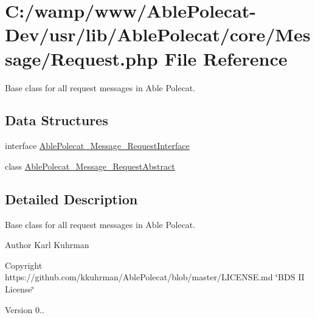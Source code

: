 \hypertarget{_request_8php}{}\section{C\+:/wamp/www/\+Able\+Polecat-\/\+Dev/usr/lib/\+Able\+Polecat/core/\+Message/\+Request.php File Reference}
\label{_request_8php}


Base class for all request messages in Able Polecat.  


\subsection*{Data Structures}
\begin{DoxyCompactItemize}
\item 
interface \hyperlink{interface_able_polecat___message___request_interface}{Able\+Polecat\+\_\+\+Message\+\_\+\+Request\+Interface}
\item 
class \hyperlink{class_able_polecat___message___request_abstract}{Able\+Polecat\+\_\+\+Message\+\_\+\+Request\+Abstract}
\end{DoxyCompactItemize}


\subsection{Detailed Description}
Base class for all request messages in Able Polecat. 

\begin{DoxyAuthor}{Author}
Karl Kuhrman 
\end{DoxyAuthor}
\begin{DoxyCopyright}{Copyright}
https\+://github.com/kkuhrman/\+Able\+Polecat/blob/master/\+L\+I\+C\+E\+N\+S\+E.\+md \char`\"{}\+B\+D\+S I\+I License\char`\"{} 
\end{DoxyCopyright}
\begin{DoxyVersion}{Version}
0.. 
\end{DoxyVersion}
